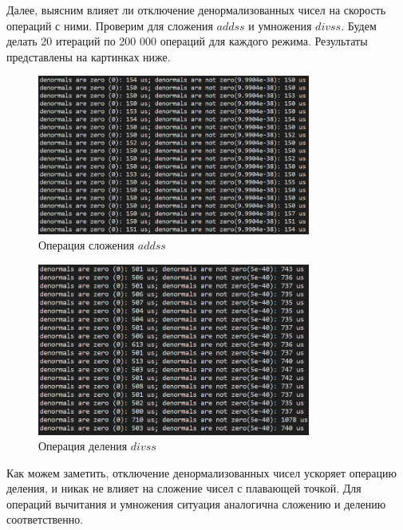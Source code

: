 \documentclass[a4paper,12pt]{article}
\begin{document}
Далее, выясним влияет ли отключение денормализованных чисел на скорость операций с ними. Проверим для сложения $addss$ и умножения $divss$. Будем делать 20 итераций по 200 000 операций для каждого режима. Результаты представлены на картинках ниже.
\begin{figure}[H]\label{fig: Operations speed sum}
    \centering
    \includegraphics[width = 0.8\textwidth]{Сложение сравнение времени.png}
    \caption{Операция сложения $addss$}
\end{figure}
\begin{figure}[H]\label{fig: Operations speed div}
    \centering
    \includegraphics[width = 0.8\textwidth]{Деление сравнение времени.png}
    \caption{Операция деления $divss$}
\end{figure}
Как можем заметить, отключение денормализованных чисел ускоряет операцию деления, и никак не влияет на сложение чисел с плавающей точкой. Для операций вычитания и умножения ситуация аналогична сложению и делению соответственно.
\end{document}
